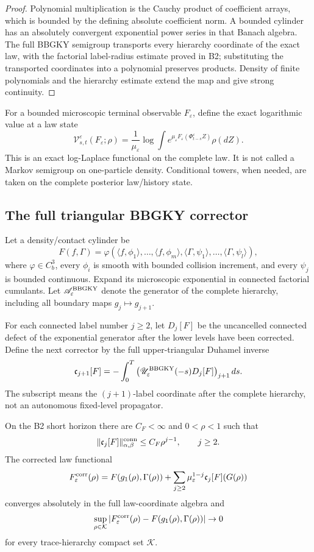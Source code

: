 \begin{proof}
Polynomial multiplication is the Cauchy product of coefficient arrays, which
is bounded by the defining absolute coefficient norm.  A bounded cylinder has
an absolutely convergent exponential power series in that Banach algebra.
The full BBGKY semigroup transports every hierarchy coordinate of the exact
law, with the factorial label-radius estimate proved in B2; substituting the
transported coordinates into a polynomial preserves products.  Density of
finite polynomials and the hierarchy estimate extend the map and give strong
continuity.
\end{proof}

For a bounded microscopic terminal observable \(F_\varepsilon\), define the
exact logarithmic value at a law state
\[
\mathcal V_{s,t}^\varepsilon(F_\varepsilon;\rho)
=\frac1{\mu_\varepsilon}
\log\int
e^{\mu_\varepsilon F_\varepsilon(\Phi_{t-s}^\varepsilon Z)}\rho(dZ).
\]
This is an exact log-Laplace functional on the complete law.  It is not called
a Markov semigroup on one-particle density.  Conditional towers, when needed,
are taken on the complete posterior law/history state.

\subsection{The full triangular BBGKY corrector}

Let a density/contact cylinder be
\[
F(f,\Gamma)=\varphi(\langle f,\phi_1\rangle,\ldots,\langle f,\phi_m\rangle,
\langle\Gamma,\psi_1\rangle,\ldots,\langle\Gamma,\psi_l\rangle),
\]
where \(\varphi\in C_b^3\), every \(\phi_i\) is smooth with bounded collision
increment, and every \(\psi_j\) is bounded continuous.  Expand its microscopic
exponential in connected factorial cumulants.  Let
\(\mathscr A_\varepsilon^{\rm BBGKY}\) denote the generator of the complete
hierarchy, including all boundary maps
\(g_j\mapsto g_{j+1}\).

For each connected label number \(j\ge2\), let
\(D_j[F]\) be the uncancelled connected defect of the exponential generator
after the lower levels have been corrected.  Define the next corrector by the
full upper-triangular Duhamel inverse
\[
\mathfrak c_{j+1}[F]
=-\int_0^T
\left(\mathscr U_\varepsilon^{\rm BBGKY}(-s)
D_j[F]\right)_{j+1}ds.
\]
The subscript means the \((j+1)\)-label coordinate after the complete
hierarchy, not an autonomous fixed-level propagator.

\begin{lemma}
\label{lem:r6-b4-correctors}
On the B2 short horizon there are \(C_F<\infty\) and \(0<\rho<1\) such that
\[
\|\mathfrak c_j[F]\|_{\alpha,\beta}^{\rm conn}
\le C_F\rho^{j-1},
\qquad j\ge2.
\]
The corrected law functional
\[
F_\varepsilon^{\rm corr}(\rho)=
F(g_1(\rho),\Gamma(\rho))+
\sum_{j\ge2}\mu_\varepsilon^{1-j}
\mathfrak c_j[F](G(\rho))
\]
converges absolutely in the full law-coordinate algebra and
\[
\sup_{\rho\in\mathcal K}
|F_\varepsilon^{\rm corr}(\rho)-F(g_1(\rho),\Gamma(\rho))|\to0
\]
for every trace-hierarchy compact set \(\mathcal K\).
\end{lemma}

